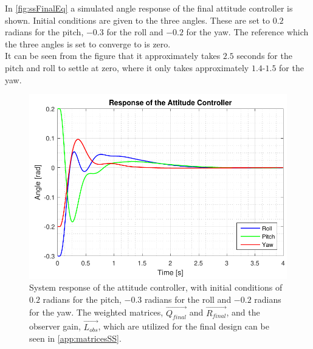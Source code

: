 In \autoref{fig:ssFinalEq} a simulated angle response of the final attitude controller is shown. Initial conditions are given to the three angles. These are set to $0.2$ radians for the pitch, $-0.3$ for the roll and $-0.2$ for the yaw. The reference which the three angles is set to converge to is zero. \\ It can be seen from the figure that it approximately takes $2.5$ seconds for the pitch and roll to settle at zero, where it only takes approximately $1.4$-$1.5$ for the yaw.
%
\begin{figure}[H]
	\centering
	\includegraphics[scale=0.8]{figures/ssFinalEq.pdf}
	\caption{System response of the attitude controller, with initial conditions of $0.2$ radians for the pitch, $-0.3$ radians for the roll and $-0.2$ radians for the yaw. The weighted matrices, $\vec{Q_{final}}$ and $\vec{R_{final}}$, and the observer gain, $\vec{L_{obs}}$, which are utilized for the final design can be seen in \autoref{app:matricesSS}.}
	\label{fig:ssFinalEq}
\end{figure}
%
